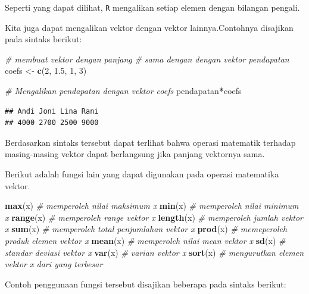 \documentclass[]{book}
\newenvironment{Shaded}{\begin{snugshade}}{\end{snugshade}}
\newcommand{\CommentTok}[1]{\textcolor[rgb]{0.56,0.35,0.01}{\textit{#1}}}
\newcommand{\DecValTok}[1]{\textcolor[rgb]{0.00,0.00,0.81}{#1}}
\newcommand{\FloatTok}[1]{\textcolor[rgb]{0.00,0.00,0.81}{#1}}
\newcommand{\KeywordTok}[1]{\textcolor[rgb]{0.13,0.29,0.53}{\textbf{#1}}}
\newcommand{\NormalTok}[1]{#1}
\newcommand{\OperatorTok}[1]{\textcolor[rgb]{0.81,0.36,0.00}{\textbf{#1}}}
\newcommand{\StringTok}[1]{\textcolor[rgb]{0.31,0.60,0.02}{#1}}
\theoremstyle{definition}
\theoremstyle{definition}
\theoremstyle{definition}
\theoremstyle{remark}
\begin{document}
Seperti yang dapat dilihat, \texttt{R} mengalikan setiap elemen dengan bilangan pengali.

Kita juga dapat mengalikan vektor dengan vektor lainnya.Contohnya disajikan pada sintaks berikut:

\begin{Shaded}
\begin{Highlighting}[]
\CommentTok{# membuat vektor dengan panjang }
\CommentTok{# sama dengan dengan vektor pendapatan}
\NormalTok{coefs <-}\StringTok{ }\KeywordTok{c}\NormalTok{(}\DecValTok{2}\NormalTok{, }\FloatTok{1.5}\NormalTok{, }\DecValTok{1}\NormalTok{, }\DecValTok{3}\NormalTok{)}

\CommentTok{# Mengalikan pendapatan dengan vektor coefs}
\NormalTok{pendapatan}\OperatorTok{*}\NormalTok{coefs}
\end{Highlighting}
\end{Shaded}

\begin{verbatim}
## Andi Joni Lina Rani 
## 4000 2700 2500 9000
\end{verbatim}

Berdasarkan sintaks tersebut dapat terlihat bahwa operasi matematik terhadap masing-masing vektor dapat berlangsung jika panjang vektornya sama.

Berikut adalah fungsi lain yang dapat digunakan pada operasi matematika vektor.

\begin{Shaded}
\begin{Highlighting}[]
\KeywordTok{max}\NormalTok{(x) }\CommentTok{# memperoleh nilai maksimum x}
\KeywordTok{min}\NormalTok{(x) }\CommentTok{# memperoleh nilai minimum x}
\KeywordTok{range}\NormalTok{(x) }\CommentTok{# memperoleh range vektor x}
\KeywordTok{length}\NormalTok{(x) }\CommentTok{# memperoleh jumlah vektor x}
\KeywordTok{sum}\NormalTok{(x) }\CommentTok{# memperoleh total penjumlahan vektor x}
\KeywordTok{prod}\NormalTok{(x) }\CommentTok{# memeperoleh produk elemen vektor x}
\KeywordTok{mean}\NormalTok{(x) }\CommentTok{# memperoleh nilai mean vektor x}
\KeywordTok{sd}\NormalTok{(x) }\CommentTok{# standar deviasi vektor x}
\KeywordTok{var}\NormalTok{(x) }\CommentTok{# varian vektor x}
\KeywordTok{sort}\NormalTok{(x) }\CommentTok{# mengurutkan elemen vektor x dari yang terbesar}
\end{Highlighting}
\end{Shaded}

Contoh penggunaan fungsi tersebut disajikan beberapa pada sintaks berikut:
\end{document}
